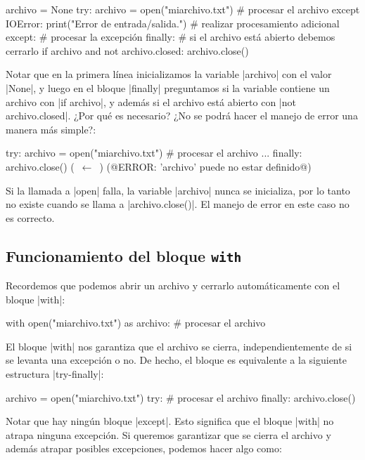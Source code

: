 \begin{codigo-python-sn}
archivo = None
try:
    archivo = open("miarchivo.txt")
    # procesar el archivo
except IOError:
    print("Error de entrada/salida.")
    # realizar procesamiento adicional
except:
    # procesar la excepción
finally:
    # si el archivo está abierto debemos cerrarlo
    if archivo and not archivo.closed:
        archivo.close()
\end{codigo-python-sn}

Notar que en la primera línea inicializamos la variable |archivo| con el valor
|None|, y luego en el bloque |finally| preguntamos si la variable contiene un
archivo con |if archivo|, y además si el archivo está abierto con
|not archivo.closed|. ¿Por qué es necesario? ¿No se podrá hacer el manejo de
error una manera más simple?:

\begin{codigo-python-sn}
try:
    archivo = open("miarchivo.txt")
    # procesar el archivo
...
finally:
    archivo.close() (~$\leftarrow$~) (@ERROR: 'archivo' puede no estar definido@)
\end{codigo-python-sn}

Si la llamada a |open| falla, la variable |archivo| nunca se inicializa, por lo
tanto no existe cuando se llama a |archivo.close()|. El manejo de error en este
caso no es correcto.

\subsection*{Funcionamiento del bloque \texttt{with}}

Recordemos que podemos abrir un archivo y cerrarlo automáticamente con el
bloque |with|:

\begin{codigo-python-sn}
with open("miarchivo.txt") as archivo:
    # procesar el archivo
\end{codigo-python-sn}

El bloque |with| nos garantiza que el archivo se cierra, independientemente de
si se levanta una excepción o no. De hecho, el bloque es equivalente a la
siguiente estructura |try-finally|:

\begin{codigo-python-sn}
archivo = open("miarchivo.txt")
try:
    # procesar el archivo
finally:
    archivo.close()
\end{codigo-python-sn}

Notar que hay ningún bloque |except|. Esto significa que el bloque |with| no
atrapa ninguna excepción. Si queremos garantizar que se cierra el archivo y
además atrapar posibles excepciones, podemos hacer algo como:

